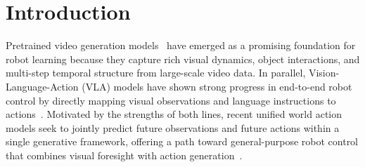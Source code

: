\documentclass{article}
\newcommand{\method}{AIM\xspace}
\newcommand{\valuemap}{action-based value map\xspace}
\newcommand{\mot}{mixture-of-transformers\xspace}
\begin{document}
\begin{abstract}
\end{abstract}

\section{Introduction}
Pretrained video generation models~\cite{dreamzero,wan2025wan,hu2024vpp,liang2025videogenerators} have emerged as a promising foundation for robot learning because they capture rich visual dynamics, object interactions, and multi-step temporal structure from large-scale video data. In parallel, Vision-Language-Action (VLA) models have shown strong progress in end-to-end robot control by directly mapping visual observations and language instructions to actions~\cite{rt2,palme,openvla,atomvla,llava-vla,pi0,pi05}. Motivated by the strengths of both lines, recent unified world action models seek to jointly predict future observations and future actions within a single generative framework, offering a path toward general-purpose robot control that combines visual foresight with action generation~\cite{unified_wm,li2026causal,bi2025motusunifiedlatentaction,pertsch2025fast,gigaworld,dreamzero}.
\end{document}
